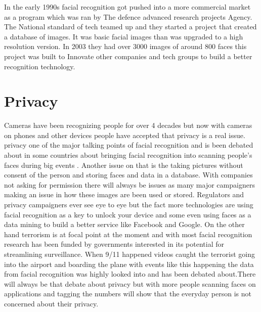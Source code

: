 \documentclass[journal]{IEEEtran}
\begin{document}
In the early 1990s facial recognition got pushed into a more commercial market as a program which was ran by The defence advanced research projects Agency. The National standard of tech teamed up and they started a project that created a database of images. It was basic facial images than was upgraded to a high resolution version. In 2003 they had over 3000 images of around 800 faces this project was built to Innovate other companies and tech groups to build a better recognition technology.


\section{Privacy }
Cameras have been recognizing people for over 4 decades but now with cameras on phones and other devices people have accepted that privacy is a real issue.  privacy one of the major talking points of facial recognition and is been debated about in some countries about bringing facial recognition into scanning people's faces during big events . Another issue on that is the taking pictures without consent of the person and storing faces and data in a database. With companies not asking for permission there will always be issues as many major campaigners making an issue in how these images are been used or stored. Regulators and privacy campaigners ever see eye to eye but the fact more technologies are using facial recognition as a key to unlock your device and some even using faces as a data mining to build a better service like Facebook and Google. On the other hand terrorism is at focal point at the moment and with most facial recognition research has been funded by governments interested in its potential for streamlining surveillance. When 9/11 happened videos caught the terrorist going into the airport and boarding the plane with events like this happening the data from facial recognition  was highly looked into and has been debated about.There will always be that debate about privacy but with more people scanning faces on applications and tagging the numbers will show that the everyday person is not concerned about their privacy.
\end{document}
